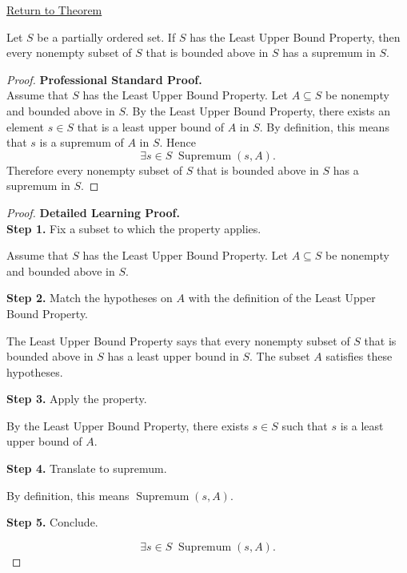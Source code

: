 \newpage
{}
\label{prf:lub-property-implies-existence-of-suprema}

\begin{remark*}[Return]
\hyperref[thm:lub-property-implies-existence-of-suprema]{Return to Theorem}
\end{remark*}

\begin{theorem*}
Let $S$ be a partially ordered set. If $S$ has the Least Upper Bound Property, then every nonempty subset of $S$ that is bounded above in $S$ has a supremum in $S$.
\end{theorem*}

\begin{proof}
\textbf{Professional Standard Proof.}~\\
Assume that $S$ has the Least Upper Bound Property. Let $A \subseteq S$ be nonempty and bounded above in $S$. By the Least Upper Bound Property, there exists an element $s \in S$ that is a least upper bound of $A$ in $S$. By definition, this means that $s$ is a supremum of $A$ in $S$. Hence
\[
\exists s \in S \; \operatorname{Supremum}(s,A).
\]
Therefore every nonempty subset of $S$ that is bounded above in $S$ has a supremum in $S$.
\end{proof}

\begin{proof}
\textbf{Detailed Learning Proof.}~\\

\textbf{Step 1.} Fix a subset to which the property applies.

Assume that $S$ has the Least Upper Bound Property. Let $A \subseteq S$ be nonempty and bounded above in $S$.

\textbf{Step 2.} Match the hypotheses on $A$ with the definition of the Least Upper Bound Property.

The Least Upper Bound Property says that every nonempty subset of $S$ that is bounded above in $S$ has a least upper bound in $S$. The subset $A$ satisfies these hypotheses.

\textbf{Step 3.} Apply the property.

By the Least Upper Bound Property, there exists $s \in S$ such that $s$ is a least upper bound of $A$.

\textbf{Step 4.} Translate to supremum.

By definition, this means $\operatorname{Supremum}(s,A)$.

\textbf{Step 5.} Conclude.

\[
\exists s \in S \; \operatorname{Supremum}(s,A).
\]
\end{proof}

